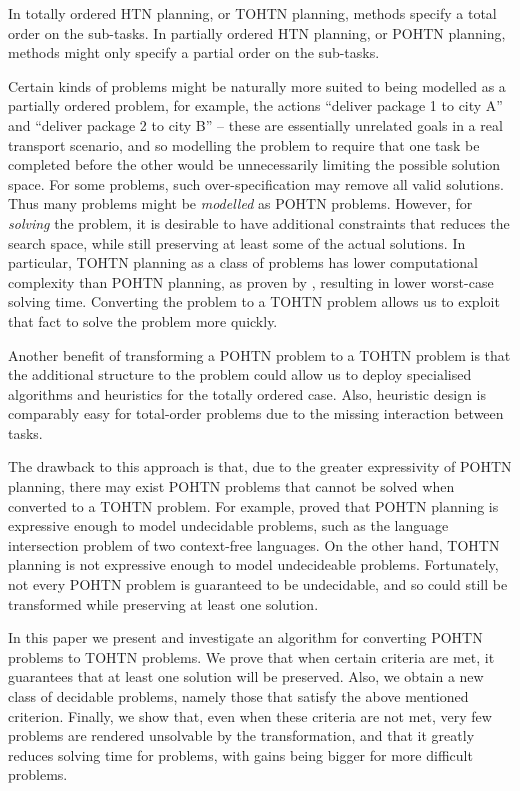 \documentclass[letterpaper]{article} %
\begin{document}
In totally ordered HTN planning, or TOHTN planning, methods specify a total order on the sub-tasks. In partially ordered HTN planning, or POHTN planning, methods might only specify a partial order on the sub-tasks. 

Certain kinds of problems might be naturally more suited to being modelled as a partially ordered problem, for example, the actions \enquote{deliver package 1 to city A} and \enquote{deliver package 2 to city B} -- these are essentially unrelated goals in a real transport scenario, and so modelling the problem to require that one task be completed before the other would be unnecessarily limiting the possible solution space. For some problems, such over-specification may remove all valid solutions. Thus many problems might be \emph{modelled} as POHTN problems. However, for \emph{solving} the problem, it is desirable to have additional constraints that reduces the search space, while still preserving at least some of the actual solutions. In particular, TOHTN planning as a class of problems has lower computational complexity than POHTN planning, as proven by \cite{ErolHTNExpressivity}, resulting in lower worst-case solving time. Converting the problem to a TOHTN problem allows us to exploit that fact to solve the problem more quickly.

Another benefit of transforming a POHTN problem to a TOHTN problem is that the additional structure to the problem could allow us to deploy specialised algorithms and heuristics for the totally ordered case. Also, heuristic design is comparably easy for total-order problems due to the missing interaction between tasks.

The drawback to this approach is that, due to the greater expressivity of POHTN planning, there may exist POHTN problems that cannot be solved when converted to a TOHTN problem. For example, \cite{ErolHTNExpressivity} proved that POHTN planning is expressive enough to model undecidable problems, such as the language intersection problem of two context-free languages. On the other hand, TOHTN planning is not expressive enough to model undecideable problems. Fortunately, not every POHTN problem is guaranteed to be undecidable, and so could still be transformed while preserving at least one solution.


In this paper we present and investigate an algorithm for converting POHTN problems to TOHTN problems. We prove that when certain criteria are met, it guarantees that at least one solution will be preserved. 
Also, we obtain a new class of decidable problems, namely those that satisfy the above mentioned criterion. Finally, we show that, even when these criteria are not met, very few problems are rendered unsolvable by the transformation, and that it greatly reduces solving time for problems, with gains being bigger for more difficult problems. 
\end{document}
